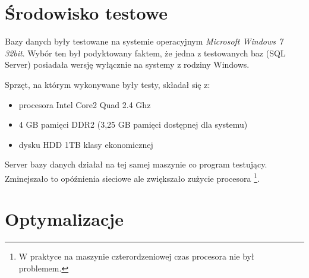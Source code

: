 

\section*{Środowisko testowe}

Bazy danych były testowane na systemie operacyjnym \emph{Microsoft Windows 7 32bit}.
Wybór ten był podyktowany faktem, że jedna z testowanych baz (SQL Server) posiadała wersję wyłącznie na systemy z rodziny Windows.

Sprzęt, na którym wykonywane były testy, składał się z:
\begin{itemize}
  \item procesora Intel Core2 Quad 2.4 Ghz
  \item 4 GB pamięci DDR2 (3,25 GB pamięci dostępnej dla systemu)
  \item dysku HDD 1TB klasy ekonomicznej
\end{itemize}

Server bazy danych działał na tej samej maszynie co program testujący.
Zminejszało to opóźnienia sieciowe ale zwiększało zużycie procesora%
\footnote{W praktyce na maszynie czterordzeniowej czas procesora nie był problemem.}.

%

\section*{Optymalizacje}

%
%

